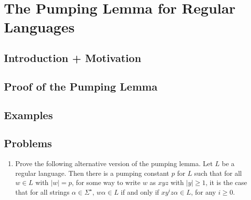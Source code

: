 \chapter{The Pumping Lemma for Regular Languages}

\section{Introduction + Motivation}

\section{Proof of the Pumping Lemma}

\section{Examples}

\section{Problems}

\begin{enumerate}
	\item Prove the following alternative version of the pumping lemma. Let $L$ be a regular language. 
	Then there is a pumping constant $p$ for $L$ such that for all $w \in L$ with $|w| = p$, for some way to write $w$ as $xyz$ with $|y| \ge 1$, it is the case that for all strings $\alpha \in \Sigma^\star$, $w\alpha \in L$ if and only if $xy^iz\alpha \in L$, for any $i \ge 0$.
	
%	
\end{enumerate}